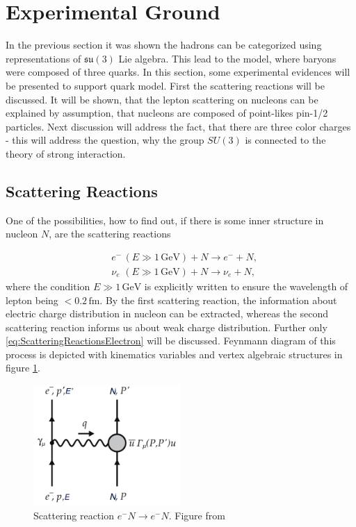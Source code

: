\documentclass[a4paper,11pt]{report}
\newcommand{\GeV}{\,\text{GeV}}
\begin{document}
\section{Experimental Ground}

In the previous section it was shown the hadrons can be categorized using
representations of $\mathfrak{su}(3)$ Lie algebra. This lead to the model, where
baryons were composed of three quarks. In this section, some experimental
evidences will be presented to support quark model. First the scattering
reactions will be discussed. It will be shown, that the lepton scattering on
nucleons can be explained by assumption, that nucleons are composed of 
point-likes pin-1/2 particles. Next discussion will address the fact, that there are
three color charges - this will address the question, why the group $SU(3)$ is
connected to the theory of strong interaction.

\subsection{Scattering Reactions}

One of the possibilities, how to find out, if there is some inner structure in
nucleon $N$, are the scattering reactions

\begin{align}
  &e^- \, (E \gg 1\GeV) + N \rightarrow e^- + N,
  \label{eq:ScatteringReactionsElectron} \\
  &\nu_e \,\, (E \gg 1\GeV) + N \rightarrow \nu_e + N,
  \label{eq:ScatteringReactionsNeutrino}
\end{align}
where the condition $E \gg 1 \GeV$ is explicitly written to ensure the wavelength
of lepton being $< 0.2\,\text{fm}$. By the first scattering reaction, the information
about electric charge distribution in nucleon can be extracted, whereas the
second scattering reaction informs us about weak charge distribution. Further only
\eqref{eq:ScatteringReactionsElectron} will be discussed. Feynmann diagram of this
process is depicted with kinematics variables and vertex algebraic structures 
in figure \ref{fig:Scattering}. 

\begin{figure}[t]
  \centering
  \includegraphics[width=0.5\textwidth]{Chapter1/Scattering.png} 
  \caption{Scattering reaction $e^-N \rightarrow e^-N$. Figure from
    \cite{QCDTextbook}}
  \label{fig:Scattering}
\end{figure}
\end{document}
